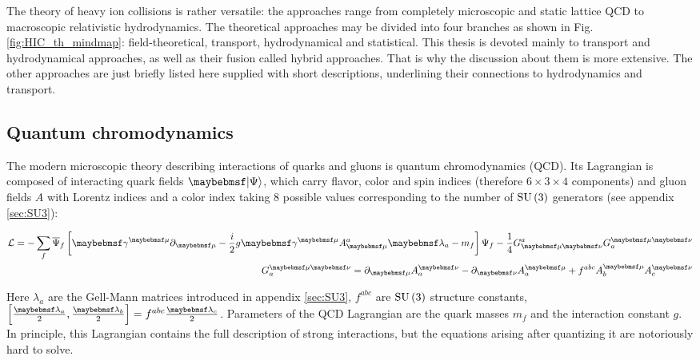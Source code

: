The theory of heavy ion collisions is rather versatile: the approaches range
from completely microscopic and static lattice QCD to macroscopic relativistic
hydrodynamics. The theoretical approaches may be divided into four branches as
shown in Fig. \ref{fig:HIC_th_mindmap}: field-theoretical, transport,
hydrodynamical and statistical. This thesis is devoted mainly to transport and
hydrodynamical approaches, as well as their fusion called hybrid approaches. That
is why the discussion about them is more extensive.  The other approaches are just
briefly listed here supplied with short descriptions, underlining their connections
to hydrodynamics and transport.

\subsection{Quantum chromodynamics} \label{sec:QCD}


The modern microscopic theory describing interactions of quarks and gluons is
quantum chromodynamics (QCD). Its Lagrangian is composed of interacting quark
fields $\ket{\Psi}$, which carry flavor, color and spin indices (therefore $6
\times 3 \times 4$ components) and gluon fields $A$ with Lorentz indices and a
color index taking 8 possible values corresponding to the number of
$\mathrm{SU}\left({3}\right)$ generators (see appendix \ref{sec:SU3}):

\begin{align} \label{eq:qcd_lagrangian}
  \mathcal{L} = - \sum_f \overline{\Psi}_f \sqbracs{ \gamma^{\mu} \partial_{\mu} -
                   \frac{i}{2} g \gamma^{\mu} A_{\mu}^a \lambda_a - m_f
                 } \Psi_f - \frac{1}{4} G_{\mu\nu}^a G^{\mu\nu}_a  \\
  G^{\mu\nu}_a = \partial_{\mu} A^{\nu}_a - \partial_{\nu} A^{\mu}_a +
                  f^{abc} A^{\mu}_b A^{\nu}_c
\end{align}

Here $\lambda_a$ are the Gell-Mann matrices introduced in appendix \ref{sec:SU3},
$f^{abc}$ are $\mathrm{SU}\left({3}\right)$ structure constants,
$\sqbracs{\frac{\lambda_a}{2},\frac{\lambda_b}{2}} = f^{abc}\frac{\lambda_c}{2}$.
Parameters of the QCD Lagrangian are the quark masses $m_f$ and the interaction constant $g$.
In principle, this Lagrangian contains the full description of strong interactions,
but the equations arising after quantizing it are notoriously hard to solve.

